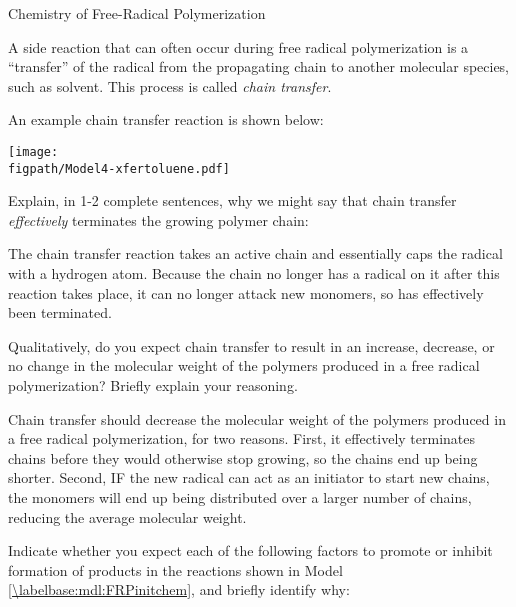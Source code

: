 \begin{activity}{Chemistry of Free-Radical Polymerization}
\begin{model}
	A side reaction that can often occur during free radical polymerization is a ``transfer'' of the radical from the propagating chain to another molecular species, such as solvent.  This process is called \emph{chain transfer}.
	
	An example chain transfer reaction is shown below:
	
			\centerline{\texttt{[image: \\figpath/Model4-xfertoluene.pdf]}}
	
\end{model}

\begin{ctqs}
	\question Explain, in 1-2 complete sentences, why we might say that chain transfer \emph{effectively} terminates the growing polymer chain:
	
		\begin{solution}[1.75in]
			The chain transfer reaction takes an active chain and essentially caps the radical with a hydrogen atom.  Because the chain no longer has a radical on it after this reaction takes place, it can no longer attack new monomers, so has effectively been terminated.
		\end{solution}
	
	\question Qualitatively, do you expect chain transfer to result in an increase, decrease, or no change in the molecular weight of the polymers produced in a free radical polymerization?  Briefly explain your reasoning.
	
		\begin{solution}[1.75in]
			Chain transfer should decrease the molecular weight of the polymers produced in a free radical polymerization, for two reasons.  First, it effectively terminates chains before they would otherwise stop growing, so the chains end up being shorter.  Second, IF the new radical can act as an initiator to start new chains, the monomers will end up being distributed over a larger number of chains, reducing the average molecular weight.
		\end{solution}
		
\end{ctqs}


\begin{exercises}

	\exercise Indicate whether you expect each of the following factors to promote or inhibit formation of products in the reactions shown in Model \ref{\labelbase:mdl:FRPinitchem}, and briefly identify why: %
	

\end{exercises}
\end{activity}
